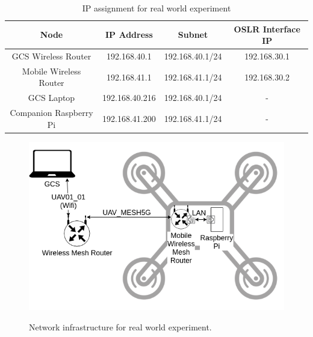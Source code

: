 \begin{table}[t]
	\caption[IP assignment for real world experiment]{\small IP assignment for real world experiment}
	\begin{center}
		\begin{tabular}{c|c|c|c}
			\hline Node & IP Address & Subnet & OSLR Interface IP\\ \hline \hline
			GCS Wireless Router & 192.168.40.1 &  192.168.40.1/24 & 192.168.30.1 \\ \hline
			Mobile Wireless Router & 192.168.41.1 & 192.168.41.1/24 & 192.168.30.2   \\ \hline 
			GCS Laptop & 192.168.40.216 & 192.168.40.1/24 & -  \\ \hline 
			Companion Raspberry Pi & 192.168.41.200 & 192.168.41.1/24 & - \\ \hline
		\end{tabular}
	\end{center}
	\label{tab:network-assignment}
\end{table} 


\begin{figure}
	\centering
	\caption[Network infrastructure for real world experiment]{\small Network infrastructure for real world experiment.} 
	\includegraphics[width=5in]{figures/experiment/real-world-network}
	\label{fig:mesh-network-real-world}
\end{figure}

